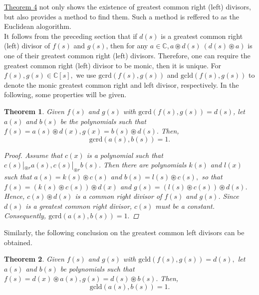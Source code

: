 \documentclass[12pt,a4paper,fleqn,twoside]{article}
\theoremstyle{plain}
\newtheorem{theorem}{Theorem}
\begin{document}
	\hyperref[theorem 4]{Theorem 4} not only shows the existence of greatest common right (left)  divisors, but also provides a method to find them. Such a method is reffered to as the Euclidean alogorithm.\\ 
	\indent It follows from the preceding section that if $d(s)$ is a greatest common right (left) divisor of $f(s)$ and $g(s)$, then for any $a\in \mathbb{C},a\circledast d(s)\: (d(s)\circledast a)$ is one of their greatest common right (left) divisors. Therefore, one can require the greatest common right (left) divisor to be monic, then it is unique. For $f(s),g(s)\in \mathbb{C}[s],$ we use $\mathrm{gcrd}(f(s), g(s))$ and $\mathrm{gcld} (f(s),g(s))$ to denote the monic greatest common right and left divisor, respectively. In the following, some properties will be given.
	\begin{theorem}
		Given $f(s)$ and $g(s)$ with $\mathrm{gcrd}(f(s),g(s))= d(s)$, let $a(s)$ and $b(s)$ be the \mbox{polynomials} such that $f(s)=a(s)\circledast d(x),g(x)=b(s)\circledast d(s).$ Then,
		\[\mathrm{gcrd}(a(s),b(s))=1.\]
		\begin{proof}
			Assume that $c(x)$ is a polynomial such that $c(s)|_{\circledast r}a(s),c(s)|_{\circledast r}b(s)$. Then there are polynomials $k(s)$ and $l(x)$ such that $a(s)=k(s)\circledast c(s)$ and $b(s)=l(s)\circledast c(s),$ so that $f(s)=(k(s)\circledast c(s))\circledast d(x)$ and $g(s)=(l(s)\circledast c(s))\circledast d(s)$. Hence, $c(s)\circledast d(s)$ is a common right divisor of $f(s)$ and $g(s)$. Since $d(s)$ is a greatest common right divisor, $c(s)$ must be a constant. Consequently, $\mathrm{gcrd}(a(s),b(s))=1.$
			\end{proof}
	\end{theorem}
	Similarly, the following conclusion on the greatest common left divisors can be obtained.
	\begin{theorem}
		Given $f(s)$ and $g(s)$ with $\mathrm{gcld}(f(s),g(s))=d(s),$ let $a(s)$ and $b(s)$ be polynomials such that $f(s)=d(x)\circledast a(s),g(s)=d(s)\circledast b(s).$ Then,
		\[\mathrm{gcld}(a(s),b(s))=1.\]
	\end{theorem}
\end{document}
